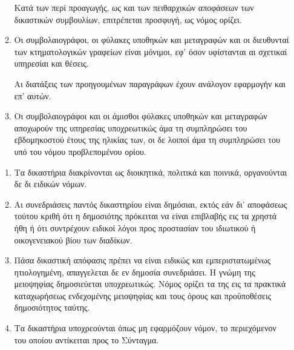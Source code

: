 \documentclass[twoside, a4paper, 10pt]{article}
\begin{document}
\begin{multicols}{2}
\begin{enumerate}
\begin{BigQuote}
\begin{enumerate}
	Κατά των περί προαγωγής, ως και των πειθαρχικών αποφάσεων των δικαστικών  συμβουλίων, επιτρέπεται προσφυγή, ως νόμος ορίζει.
  \item[4.] Οι συμβολαιογράφοι, οι φύλακες υποθηκών και μεταγραφών και οι διευθυνταί των κτηματολογικών γραφείων είναι μόνιμοι, εφ' όσον υφίστανται αι σχετικαί υπηρεσίαι και θέσεις.

	Αι διατάξεις  των προηγουμένων παραγράφων έχουν ανάλογον εφαρμογήν και επ' αυτών.
  \item[5.] Οι συμβολαιογράφοι και οι άμισθοι φύλακες υποθηκών και μεταγραφών αποχωρούν της υπηρεσίας υποχρεωτικώς άμα τη συμπληρώσει του εβδομηκοστού έτους της ηλικίας των, οι δε λοιποί άμα τη συμπληρώσει του υπό του νόμου προβλεπομένου ορίου.
\end{enumerate}

\begin{enumerate}
  \item[1.] Τα δικαστήρια διακρίνονται ως διοικητικά, πολιτικά και ποινικά, οργανούνται δε  δι ειδικών νόμων.
  \item[2.] Αι συνεδριάσεις παντός δικαστηρίου είναι δημόσιαι, εκτός εάν δι' αποφάσεως τούτου κριθή  ότι η δημοσιότης πρόκειται να είναι επιβλαβής εις τα χρηστά ήθη ή ότι συντρέχουν ειδικοί λόγοι προς προστασίαν του ιδιωτικού ή οικογενειακού βίου των διαδίκων.
  \item[3.] Πάσα δικαστική απόφασις πρέπει να είναι ειδικώς και εμπεριστατωμένως ητιολογημένη, απαγγελεται δε εν δημοσία συνεδριάσει. Η γνώμη της μειοψηφίας δημοσιεύεται υποχρεωτικώς. Νόμος ορίζει τα της εις τα πρακτικά καταχωρήσεως ενδεχομένης μειοψηφίας και τους όρους και προϋποθέσεις δημοσιότητος ταύτης.
  \item[4.] Τα δικαστήρια υποχρεούνται όπως μη εφαρμόζουν νόμον, το περιεχόμενον του οποίου αντίκειται προς το Σύνταγμα.
\end{enumerate}


\end{BigQuote}
\end{enumerate}
\end{multicols}
\end{document}
